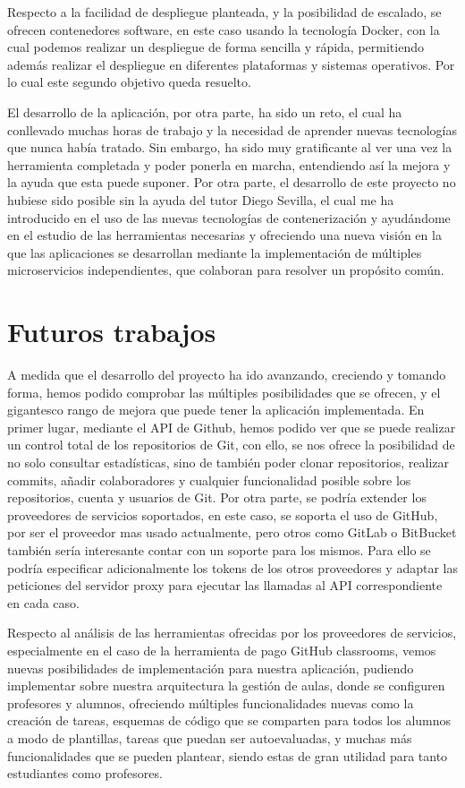 Respecto a la facilidad de despliegue planteada, y la posibilidad de
escalado, se ofrecen contenedores software, en este caso usando la
tecnología Docker, con la cual podemos realizar un despliegue de forma
sencilla y rápida, permitiendo además realizar el despliegue en diferentes
plataformas y sistemas operativos. Por lo cual este segundo objetivo queda
resuelto.

El desarrollo de la aplicación, por otra parte, ha sido un reto, el cual ha
conllevado muchas horas de trabajo y la necesidad de aprender nuevas
tecnologías que nunca había tratado. Sin embargo, ha sido muy gratificante
al ver una vez la herramienta completada y poder ponerla en marcha,
entendiendo así la mejora y la ayuda que esta puede suponer. Por otra
parte, el desarrollo de este proyecto no hubiese sido posible sin la ayuda
del tutor Diego Sevilla, el cual me ha introducido en el uso de las nuevas
tecnologías de contenerización y ayudándome en el estudio de las
herramientas necesarias y ofreciendo una nueva visión en la que las
aplicaciones se desarrollan mediante la implementación de múltiples
microservicios independientes, que colaboran para resolver un propósito
común.


\section{Futuros trabajos}

A medida que el desarrollo del proyecto ha ido avanzando, creciendo y
tomando forma, hemos podido comprobar las múltiples posibilidades que se
ofrecen, y el gigantesco rango de mejora que puede tener la aplicación
implementada. En primer lugar, mediante el API de Github, hemos podido ver
que se puede realizar un control total de los repositorios de Git, con
ello, se nos ofrece la posibilidad de no solo consultar estadísticas, sino
de también poder clonar repositorios, realizar commits, añadir
colaboradores y cualquier funcionalidad posible sobre los repositorios,
cuenta y usuarios de Git. Por otra parte, se podría extender los proveedores de 
servicios soportados, en este caso, se soporta el uso de GitHub, por ser el 
proveedor mas usado actualmente, pero otros como GitLab o BitBucket también
sería interesante contar con un soporte para los mismos. Para ello se podría 
especificar adicionalmente los tokens de los otros proveedores y adaptar las 
peticiones del servidor proxy para ejecutar las llamadas al API correspondiente 
en cada caso.

Respecto al análisis de las herramientas ofrecidas por los proveedores de
servicios, especialmente en el caso de la herramienta de pago GitHub
classrooms, vemos nuevas posibilidades de implementación para nuestra
aplicación, pudiendo implementar sobre nuestra arquitectura la gestión de
aulas, donde se configuren profesores y alumnos, ofreciendo múltiples
funcionalidades nuevas como la creación de tareas, esquemas de código que
se comparten para todos los alumnos a modo de plantillas, tareas que puedan
ser autoevaluadas, y muchas más funcionalidades que se pueden plantear,
siendo estas de gran utilidad para tanto estudiantes como profesores.

